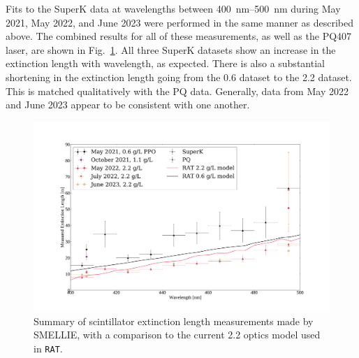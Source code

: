 
Fits to the SuperK data at wavelengths between \SIrange{400}{500}{\nm} during May 2021, May 2022, and June 2023 were performed in the same manner as described above. The combined results for all of these measurements, as well as the PQ407 laser, are shown in Fig.~\ref{fig:smellie_ext_length_final_results}. All three SuperK datasets show an increase in the extinction length with wavelength, as expected. There is also a substantial shortening in the extinction length going from the \SI{0.6}{\gpl} dataset to the \SI{2.2}{\gpl} dataset. This is matched qualitatively with the PQ data. Generally, data from May 2022 and June 2023 appear to be consistent with one another.

\begin{figure}
    \centering
    \includegraphics[width=\textwidth]{5_SMELLIEAnalysis/images/ext_length_results_summary.pdf}
    \caption[Summary of scintillator extinction length measurements made by SMELLIE]
    {Summary of scintillator extinction length measurements made by SMELLIE, with a comparison to the current \SI{2.2}{\gpl} optics model used in \texttt{RAT}.}
    \label{fig:smellie_ext_length_final_results}
\end{figure}

